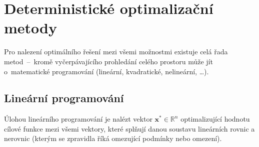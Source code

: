 \documentclass[twoside]{ctuthesis}
\newcounter{magicrownumbers}
\newcommand\rownumber{\stepcounter{magicrownumbers}\arabic{magicrownumbers}}
\begin{document}
%
%
%
%


\section{Deterministické optimalizační metody}

Pro nalezení optimálního řešení mezi všemi možnostmi existuje celá řada metod~–~kromě vyčerpávajícího prohledání celého prostoru může jít o~matematické programování (lineární, kvadratické, nelineární, …).

\subsection{Lineární programování}

Úlohou lineárního programování je nalézt vektor $\boldsymbol{x}^{\ast} \in \mathbb{R}^n$ optimalizující hodnotu cílové funkce mezi všemi vektory, které splňují danou soustavu lineárních rovnic a nerovnic (kterým se zpravidla říká omezující podmínky nebo omezení). \cite{matousek2006linearni}
\end{document}
